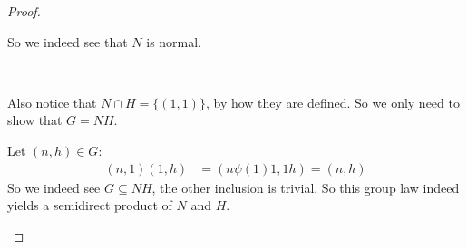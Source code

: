 \begin{exercise}
\begin{proof}
\begin{enumerate}[label = (\alph*)]
                So we indeed see that $N$ is normal.

                \

                Also notice that $N\cap H = \{(1,1)\}$, by how they are defined. So we only need to show that $G = NH$.
                
                Let $(n,h)\in G$:\begin{align*}
                    (n,1)(1,h) &= (n\psi(1)1, 1h) = (n,h)
                \end{align*}
                So we indeed see $G\subseteq NH$, the other inclusion is trivial. So this group law indeed yields a semidirect product of $N$ and $H$.
            \end{enumerate}    
    \end{proof}
\end{exercise}

